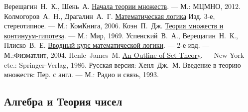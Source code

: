 \documentclass[11pt]{book}
\theoremstyle{mythm}
\theoremstyle{mydef}
\numberwithin{upr}{chapter}
\begin{document}
\begin{thebibliography}{199}
 Верещагин~Н.~К., Шень~А. \href{https://www.mccme.ru/free-books/shen/shen-logic-part1-2.pdf}{Начала теории множеств}. --- М.: МЦМНО, 2012. 
 Колмогоров~А.~Н., Драгалин~А.~Г. \href{https://www.phantastike.com/math/matematicheskaya_logika/djvu/}{Математическая логика} Изд. 3-е, стереотипное. — М.: КомКнига, 2006.
 Коэн~П.~Дж. \href{http://bookfi.net/dl/440950/e8a96b}{Теория множеств и континуум-гипотеза}. --- М.: Мир, 1969.
 Успенский~В.~А., Верещагин~Н.~К., Плиско~В.~Е. \href{https://fileskachat.com/getfile/19485_2a40998a4dda0d3289d2f989d97516c7}{Вводный курс математической логики}. --- 2-е изд. --- М.:Физматлит, 2004.
 Henle~James~M. \href{https://www.twirpx.com/file/651231/}{An Outline of Set Theory}. --- New York etc.: Springer-Verlag, 1986. Русская версия: Хенл~Дж.~М. Введение в теорию множеств: Пер. с англ. --- М.: Радио и связь, 1993.



\subsection*{Алгебра и Теория чисел}


\end{thebibliography}
\end{document}
